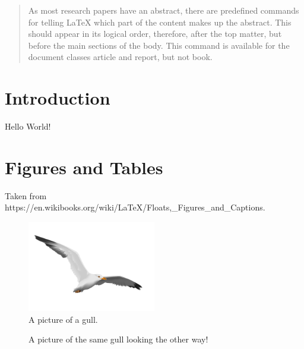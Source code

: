 \documentclass[11pt,a4paper]{article}
\begin{document}
    \begin{abstract}
        As most research papers have an abstract, there are predefined commands for telling LaTeX which part of the content makes up the abstract.
        This should appear in its logical order, therefore, after the top matter, but before the main sections of the body.
        This command is available for the document classes article and report, but not book.
    \end{abstract}

    \section{Introduction}
    Hello World!

    \section{Figures and Tables}
        Taken from https://en.wikibooks.org/wiki/LaTeX/Floats,_Figures_and_Captions.

        \begin{figure}
          \caption{A picture of a gull.}
          \centering
            \includegraphics[width=0.5\textwidth]{gull}
        \end{figure}

        \begin{figure}
          \centering
          \caption{A picture of the same gull looking the other way!}
        \end{figure}
\end{document}
